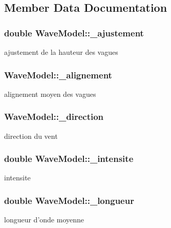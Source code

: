 \subsection{Member Data Documentation}
\hypertarget{classWaveModel_a8b14fcf6aa82abbe24182fbe47bf4654}{
\subsubsection[{\-\_\-ajustement}]{\setlength{\rightskip}{0pt plus 5cm}double Wave\-Model\-::\-\_\-ajustement\hspace{0.3cm}{\ttfamily [protected]}}}\label{classWaveModel_a8b14fcf6aa82abbe24182fbe47bf4654}
ajustement de la hauteur des vagues \hypertarget{classWaveModel_aaa61347e03992faa1e6718d459297f2e}{
\subsubsection[{\-\_\-alignement}]{ Wave\-Model\-::\-\_\-alignement\hspace{0.3cm}{\ttfamily [protected]}}}\label{classWaveModel_aaa61347e03992faa1e6718d459297f2e}
alignement moyen des vagues \hypertarget{classWaveModel_ab0ce1c49c362d60e89cef37e49cafb78}{
\subsubsection[{\-\_\-direction}]{ Wave\-Model\-::\-\_\-direction\hspace{0.3cm}{\ttfamily [protected]}}}\label{classWaveModel_ab0ce1c49c362d60e89cef37e49cafb78}
direction du vent \hypertarget{classWaveModel_acbfbba2af6232fd3089615ab795a895e}{
\subsubsection[{\-\_\-intensite}]{\setlength{\rightskip}{0pt plus 5cm}double Wave\-Model\-::\-\_\-intensite\hspace{0.3cm}{\ttfamily [protected]}}}\label{classWaveModel_acbfbba2af6232fd3089615ab795a895e}
intensite \hypertarget{classWaveModel_a4a94c157f40e1a842dff28b001964ab7}{
\subsubsection[{\-\_\-longueur}]{\setlength{\rightskip}{0pt plus 5cm}double Wave\-Model\-::\-\_\-longueur\hspace{0.3cm}{\ttfamily [protected]}}}\label{classWaveModel_a4a94c157f40e1a842dff28b001964ab7}
longueur d'onde moyenne 

